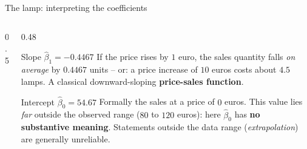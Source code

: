 \documentclass[aspectratio=169,11pt]{beamer}
\def\lamplist{80/20,85/17,90/15,95/9,100/11,105/8,110/4,115/4,120/2}
\newcommand{\lamppoints}{\addplot[only marks, mark=*, mark size=2.2pt, color=hsbiblau]
  coordinates {(80,20) (85,17) (90,15) (95,9) (100,11) (105,8) (110,4) (115,4) (120,2)};}
\newcommand{\residualsof}[4]{%
  \foreach \px/\py in #1 {%
    \pgfmathsetmacro{\yh}{#2 + #3*\px}%
    \edef\tmpdraw{\noexpand\draw[#4] (axis cs:\px,\py) -- (axis cs:\px,\yh);}%
    \tmpdraw
  }}
\begin{document}
\begin{frame}{The lamp: interpreting the coefficients}
  \begin{columns}[T]
    \begin{column}{0.5\textwidth}
    \end{column}
    \begin{column}{0.48\textwidth}
      \small
      \begin{block}{Slope $\hat{\beta}_1 = -0.4467$}
        If the price rises by $1$ euro, the sales quantity falls \emph{on
        average} by $0.4467$ units -- or: a price increase of $10$ euros costs
        about $4.5$ lamps. A classical downward-sloping
        \textbf{price-sales function}.
      \end{block}
      \begin{alertblock}{Intercept $\hat{\beta}_0 = 54.67$}
        Formally the sales at a price of $0$ euros. This value lies \emph{far}
        outside the observed range ($80$ to $120$ euros): here $\hat{\beta}_0$
        has \textbf{no substantive meaning}. Statements outside the data
        range (\emph{extrapolation}) are generally unreliable.
      \end{alertblock}
    \end{column}
  \end{columns}
\end{frame}
\end{document}
